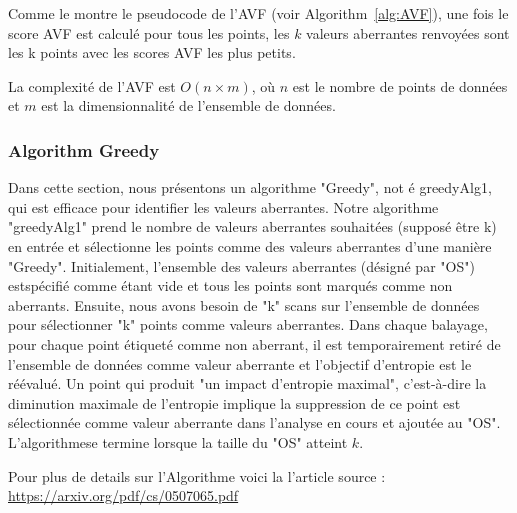 \noindent Comme le montre le pseudocode de l'AVF (voir  Algorithm~\ref{alg:AVF}), une fois le score AVF est calculé pour tous les points, les $k$ valeurs aberrantes renvoyées sont les k points avec les scores AVF les plus petits. 

\noindent La complexité de l'AVF est $O(n\times m)$, où $n$ est le nombre de points de données et $m$ est la dimensionnalité de l'ensemble de données.


\subsubsection*{Algorithm Greedy}

Dans cette section, nous présentons un algorithme  "Greedy", not é greedyAlg1, qui est efficace  pour identifier les valeurs aberrantes.
Notre algorithme "greedyAlg1" prend le nombre de valeurs aberrantes souhaitées (supposé être k) en entrée et sélectionne les points comme des valeurs aberrantes d'une manière "Greedy". 
Initialement, l'ensemble des valeurs aberrantes (désigné par "OS") estspécifié comme étant vide et tous les points sont marqués comme non aberrants. 
Ensuite, nous avons besoin de "k" scans sur l'ensemble de données pour sélectionner "k" points comme valeurs aberrantes. 
Dans chaque balayage, pour chaque point étiqueté comme non aberrant, il est temporairement retiré de l'ensemble de données comme valeur aberrante et l'objectif d'entropie est le réévalué.
Un point qui produit "un impact d'entropie maximal", c'est-à-dire la diminution maximale de l'entropie implique la suppression de ce point est sélectionnée comme valeur aberrante dans l'analyse en cours et ajoutée au "OS". L'algorithmese termine lorsque la taille du "OS" atteint $k$.


Pour plus de details sur l'Algorithme voici la l'article source : \url{https://arxiv.org/pdf/cs/0507065.pdf} 




